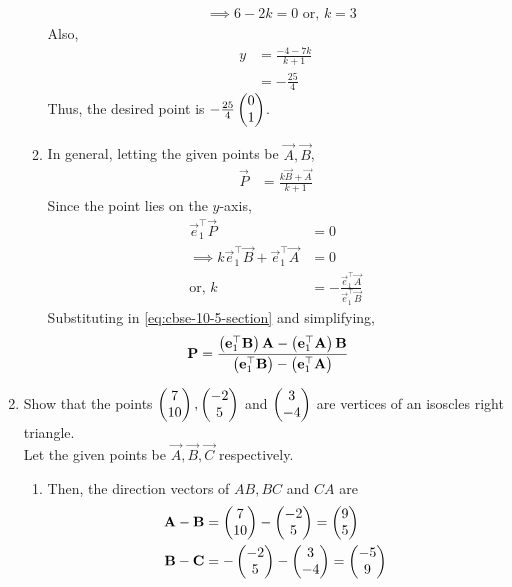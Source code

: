 \documentclass[journal,12pt,twocolumn]{IEEEtran}
\renewcommand\thesection{\arabic{section}}
\begin{document}
\begin{enumerate}[label=\thesection.\arabic*.,ref=\thesection.\theenumi]
\begin{enumerate}
\begin{align}
			\\
			&	\implies 6 - 2k = 0 \text{ or, }k = 3
		\end{align}
		Also, 
		\begin{align}
			y &= \frac{-4-7k}{k+1}
			\\
			&=-\frac{25}{4}
		\end{align}
		Thus, the desired point is  $ -\frac{25}{4}
\begin{pmatrix}0 \\ 1 \end{pmatrix}$.
\item In general, letting the given points be $\vec{A}, \vec{B}$, 
		\begin{align}
			\vec{P} &= \frac{k\vec{B}+ \vec{A} }{k+1}
			\label{eq:cbse-10-5-section}
		\end{align}
		Since the point lies on the $y$-axis, 
		\begin{align}
			\vec{e}_1^{\top}\vec{P} &= 0
			\\
			\implies k\vec{e}_1^{\top}\vec{B}+ \vec{e}_1^{\top}\vec{A} &=0
			\\
			\text{or, } k &=- \frac{\vec{e}_1^{\top}\vec{A}}{\vec{e}_1^{\top}\vec{B}}
		\end{align}
Substituting in 			\eqref{eq:cbse-10-5-section} and simplifying, 
		\begin{align}
			\mathbf{P} &= \frac{\left(\mathbf{e}_1^{\top}\mathbf{B}\right)\mathbf{A}- \left(\mathbf{e}_1^{\top}\mathbf{A}\right)\mathbf{B} }{\left(\mathbf{e}_1^{\top}\mathbf{B}\right)-\left(\mathbf{e}_1^{\top}\mathbf{A}\right)}
		\end{align}
		\end{enumerate}
	\item   Show that the points $\begin{pmatrix}7 \\ 10\end{pmatrix}, \begin{pmatrix}-2 \\ 5\end{pmatrix} $ and $\begin{pmatrix}3 \\ -4\end{pmatrix}$ are vertices of an isoscles right triangle.
		\\
		\solution Let the given points be $\vec{A}, \vec{B}, \vec{C}$ respectively. 
		\begin{enumerate}
			\item Then, the direction vectors of $AB, BC$ and $CA$ are
		\begin{align}
			\vec{A} -\vec{B}&= \myvec{7 \\ 10} -\myvec{-2 \\ 5} = \myvec{9 \\ 5}
			\\
			\vec{B} -\vec{C}&=  -\myvec{-2 \\ 5}-\myvec{3 \\ -4} = \myvec{-5 \\ 9}

\end{align}
\end{enumerate}
\end{enumerate}
\end{document}
